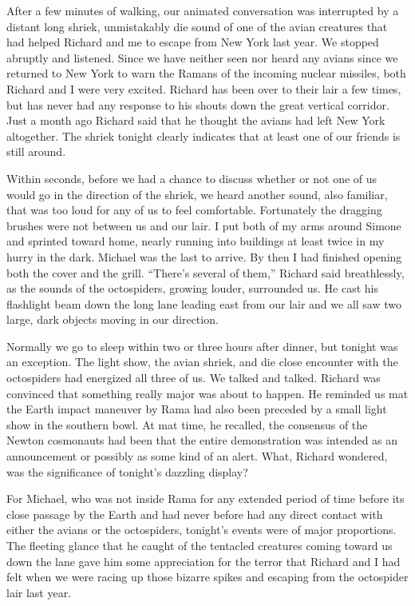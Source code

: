 \documentclass[]{article}
\begin{document}
After a few minutes of walking, our animated conversation was interrupted by a distant long shriek, unmistakably die sound of one of the avian creatures that had helped Richard and me to escape from New York last year. We stopped abruptly and listened. Since we have neither seen nor heard any avians since we returned to New York to warn the Ramans of the incoming nuclear missiles, both Richard and I were very excited. Richard has been over to their lair a few times, but has never had any response to his shouts down the great vertical corridor. Just a month ago Richard said that he thought the avians had left New York altogether. The shriek tonight clearly indicates that at least one of our friends is still around.

Within seconds, before we had a chance to discuss whether or not one of us would go in the direction of the shriek, we heard another sound, also familiar, that was too loud for any of us to feel comfortable. Fortunately the dragging brushes were not between us and our lair. I put both of my arms around Simone and sprinted toward home, nearly running into buildings at least twice in my hurry in the dark. Michael was the last to arrive. By then I had finished opening both the cover and the grill. “There’s several of them,” Richard said breathlessly, as the sounds of the octospiders, growing louder, surrounded us. He cast his flashlight beam down the long lane leading east from our lair and we all saw two large, dark objects moving in our direction.

Normally we go to sleep within two or three hours after dinner, but tonight was an exception. The light show, the avian shriek, and die close encounter with the octospiders had energized all three of us. We talked and talked. Richard was convinced that something really major was about to happen. He reminded us mat the Earth impact maneuver by Rama had also been preceded by a small light show in the southern bowl. At mat time, he recalled, the consensus of the Newton cosmonauts had been that the entire demonstration was intended as an announcement or possibly as some kind of an alert. What, Richard wondered, was the significance of tonight’s dazzling display?

For Michael, who was not inside Rama for any extended period of time before its close passage by the Earth and had never before had any direct contact with either the avians or the octospiders, tonight’s events were of major proportions. The fleeting glance that he caught of the tentacled creatures coming toward us down the lane gave him some appreciation for the terror that Richard and I had felt when we were racing up those bizarre spikes and escaping from the octospider lair last year.
\end{document}
